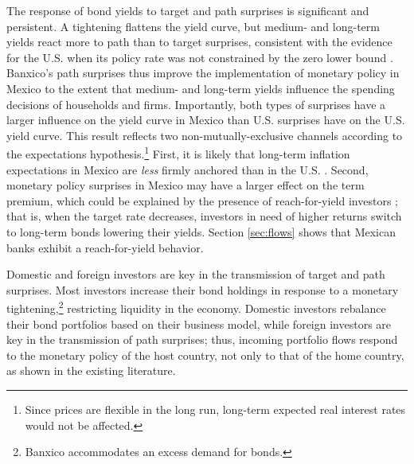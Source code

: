 {The response of bond yields to target and path surprises is significant and persistent. A tightening flattens the yield curve, but medium- and long-term yields react more to path than to target surprises, consistent with the evidence for the U.S. when its policy rate was not constrained by the zero lower bound \parencite{GSS:2005a}. 
Banxico's path surprises thus improve the implementation of monetary policy in Mexico to the extent that medium- and long-term yields influence the spending decisions of households and firms. %
Importantly, both types of surprises have a larger influence on the yield curve in Mexico than U.S. surprises have on the U.S. yield curve. This result reflects two non-mutually-exclusive channels according to the expectations hypothesis.\footnote{ Since prices are flexible in the long run, long-term expected real interest rates would not be affected.} 
First, it is likely that long-term inflation expectations in Mexico are \textit{less} firmly anchored than in the U.S. \parencite{AndreasenChristensenRiddell:2021,Beauregard_etal:2021}. 
Second, monetary policy surprises in Mexico may have a larger effect on the term premium, which could be explained by the presence of reach-for-yield investors \parencite{HansonStein:2015}; that is, when the target rate decreases, investors in need of higher returns switch to long-term bonds lowering their yields. Section \ref{sec:flows} shows that Mexican banks exhibit a reach-for-yield behavior. %

Domestic and foreign investors are key in the transmission of target and path surprises. 
Most investors increase their bond holdings in response to a monetary tightening,\footnote{Banxico accommodates an excess demand for bonds.} restricting liquidity in the economy. 
Domestic investors rebalance their bond portfolios based on their business model, while foreign investors are key in the transmission of path surprises; thus, incoming portfolio flows respond to the monetary policy of the host country, not only to that of the home country, as shown in the existing literature.  

}

